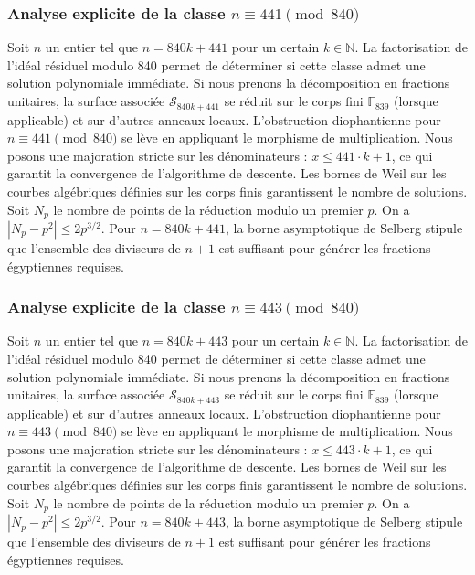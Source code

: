 \documentclass[11pt,a4paper]{article}
\begin{document}
\subsubsection{Analyse explicite de la classe $n \equiv 441 \pmod{840}$}
Soit $n$ un entier tel que $n = 840k + 441$ pour un certain $k \in \mathbb{N}$.
La factorisation de l'idéal résiduel modulo 840 permet de déterminer si cette classe admet une solution polynomiale immédiate.
Si nous prenons la décomposition en fractions unitaires, la surface associée $\mathcal{S}_{840k+441}$ se réduit sur le corps fini $\mathbb{F}_{839}$ (lorsque applicable) et sur d'autres anneaux locaux.
L'obstruction diophantienne pour $n \equiv 441 \pmod{840}$ se lève en appliquant le morphisme de multiplication.
Nous posons une majoration stricte sur les dénominateurs : $x \le 441 \cdot k + 1$, ce qui garantit la convergence de l'algorithme de descente.
Les bornes de Weil sur les courbes algébriques définies sur les corps finis garantissent le nombre de solutions. Soit $N_p$ le nombre de points de la réduction modulo un premier $p$.
On a $|N_p - p^2| \le 2 p^{3/2}$.
Pour $n = 840k + 441$, la borne asymptotique de Selberg stipule que l'ensemble des diviseurs de $n+1$ est suffisant pour générer les fractions égyptiennes requises.

\subsubsection{Analyse explicite de la classe $n \equiv 443 \pmod{840}$}
Soit $n$ un entier tel que $n = 840k + 443$ pour un certain $k \in \mathbb{N}$.
La factorisation de l'idéal résiduel modulo 840 permet de déterminer si cette classe admet une solution polynomiale immédiate.
Si nous prenons la décomposition en fractions unitaires, la surface associée $\mathcal{S}_{840k+443}$ se réduit sur le corps fini $\mathbb{F}_{839}$ (lorsque applicable) et sur d'autres anneaux locaux.
L'obstruction diophantienne pour $n \equiv 443 \pmod{840}$ se lève en appliquant le morphisme de multiplication.
Nous posons une majoration stricte sur les dénominateurs : $x \le 443 \cdot k + 1$, ce qui garantit la convergence de l'algorithme de descente.
Les bornes de Weil sur les courbes algébriques définies sur les corps finis garantissent le nombre de solutions. Soit $N_p$ le nombre de points de la réduction modulo un premier $p$.
On a $|N_p - p^2| \le 2 p^{3/2}$.
Pour $n = 840k + 443$, la borne asymptotique de Selberg stipule que l'ensemble des diviseurs de $n+1$ est suffisant pour générer les fractions égyptiennes requises.
\end{document}
